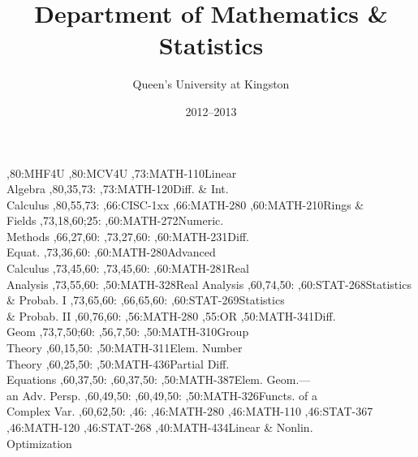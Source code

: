 \documentclass[9pt]{extarticle}
\begin{document}
\title{Department of Mathematics \& Statistics}
\author{Queen's University at Kingston}
\date{2012--2013}
\maketitle
\thispagestyle{empty}
\begin{chart}
,80:{MHF4U}
,80:{MCV4U}
,73:{MATH-110}{Linear\\Algebra}{}
  ,80,35,73:
,73:{MATH-120}{Diff. \& Int.\\Calculus}{}
  ,80,55,73:
,66:{CISC-1xx}
,66:{MATH-280}
,60:{MATH-210}{Rings \&\\Fields}{}
  ,73,18,60;25:
,60:{MATH-272}{Numeric.\\Methods}{}
  ,66,27,60:
  ,73,27,60:
,60:{MATH-231}{Diff.\\Equat.}{}
  ,73,36,60:
,60:{MATH-280}{Advanced\\Calculus}{}
  ,73,45,60:
  ,73,45,60:
,60:{MATH-281}{Real\\Analysis}{}
  ,73,55,60:
,50:{MATH-328}{Real Analysis}{}
  ,60,74,50:
,60:{STAT-268}{Statistics\\\& Probab. I}{}
  ,73,65,60:
  ,66,65,60:
,60:{STAT-269}{Statistics\\\& Probab. II}{}
  ,60,76,60:
,56:{MATH-280}
,55:{OR}
,50:{MATH-341}{Diff.\\Geom}{}
  ,73,7,50;60:
  ,56,7,50:
,50:{MATH-310}{Group\\Theory}{}
  ,60,15,50:
,50:{MATH-311}{Elem. Number\\Theory}{}
  ,60,25,50:
,50:{MATH-436}{Partial Diff.\\Equations}{}
  ,60,37,50:
  ,60,37,50:
,50:{MATH-387}{Elem. Geom.---\\an Adv. Persp.}{}
  ,60,49,50:
  ,60,49,50:
,50:{MATH-326}{Functs. of a\\Complex Var.}{}
  ,60,62,50:
,46:{}
,46:{MATH-280}
,46:{MATH-110}
,46:{STAT-367}
,46:{MATH-120}
,46:{STAT-268}
,40:{MATH-434}{Linear \& Nonlin.\\Optimization}{}

\end{chart}
\end{document}
